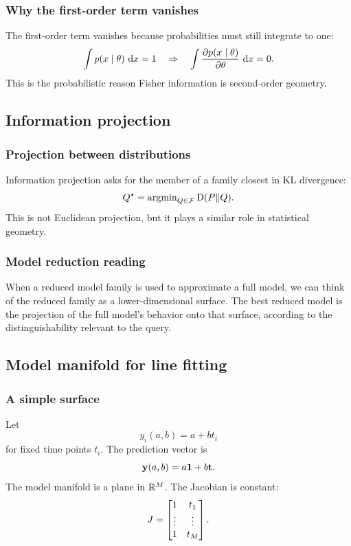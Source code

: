 \subsubsection*{Why the first-order term vanishes}

The first-order term vanishes because probabilities must still integrate to one:
\[
  \int p(x\mid\theta)\,\mathop{}\!\mathrm{d} x=1
  \quad\Rightarrow\quad
  \int \frac{\partial p(x\mid\theta)}{\partial \theta}\,\mathop{}\!\mathrm{d} x=0.
\]
This is the probabilistic reason Fisher information is second-order geometry.

\subsection{Information projection}

\subsubsection*{Projection between distributions}

Information projection asks for the member of a family closest in KL divergence:
\[
  Q^\star
  =
  \operatorname{argmin}_{Q\in\mathcal{F}}
  \operatorname{D}(P\|Q).
\]
This is not Euclidean projection, but it plays a similar role in statistical geometry.

\subsubsection*{Model reduction reading}

When a reduced model family is used to approximate a full model, we can think of the reduced family as a lower-dimensional surface.  The best reduced model is the projection of the full model's behavior onto that surface, according to the distinguishability relevant to the query.

\subsection{Model manifold for line fitting}

\subsubsection*{A simple surface}

Let
\[
  y_i(a,b)=a+bt_i
\]
for fixed time points \(t_i\).  The prediction vector is
\[
  \mathbf{y}(a,b)=a\mathbf{1}+b\mathbf{t}.
\]
The model manifold is a plane in \(\mathbb{R}^M\).  The Jacobian is constant:
\[
  J=
  \begin{bmatrix}
    1 & t_1\\
    \vdots & \vdots\\
    1 & t_M
  \end{bmatrix}.
\]

